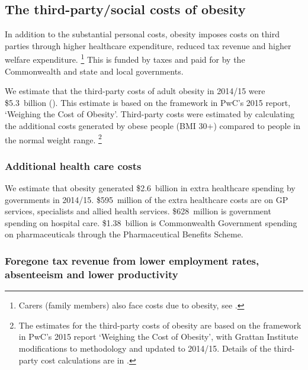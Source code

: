 \documentclass[embargoed]{grattan}
\begin{document}
\subsection{The third-party/social costs of obesity}\label{the-third-partysocial-costs-of-obesity}

In addition to the substantial personal costs, obesity imposes costs on third parties through higher healthcare expenditure, reduced tax revenue and higher welfare expenditure.%
\footnote{Carers (family members) also face costs due to obesity, see \textcite{Freebairn2010Taxationobesity}.} This is funded by taxes and paid for by the Commonwealth and state and local governments.

We estimate that the third-party costs of adult obesity in 2014/15 were \$5.3~billion ().
This estimate is based on the framework in PwC's 2015 report, `Weighing the Cost of Obesity'.
Third-party costs were estimated by calculating the additional costs generated by obese people (BMI 30+) compared to people in the normal weight range.%
\footnote{The estimates for the third-party costs of obesity are based on the framework in PwC's 2015 report `Weighing the Cost of Obesity', with Grattan Institute modifications to methodology and updated to 2014/15.
Details of the third-party cost calculations are in .}

\subsubsection{Additional health care costs}\label{additional-health-care-costs}

We estimate that obesity generated \$2.6~billion in extra healthcare spending by governments in 2014/15. \$595~million of the extra healthcare costs are on GP services, specialists and allied health services. \$628~million is government spending on hospital care. \$1.38~billion is Commonwealth Government spending on pharmaceuticals through the Pharmaceutical Benefits Scheme.

\subsubsection{Foregone tax revenue from lower employment rates, absenteeism and lower productivity}\label{foregone-tax-revenue-from-lower-employment-rates-absenteeism-and-lower-productivity}
\end{document}
